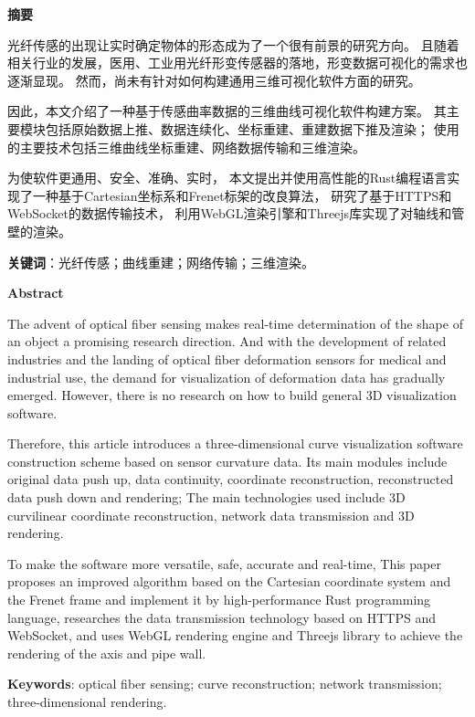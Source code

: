\clearpage
\begin{center}
    \bfseries {} 摘要
\end{center}

光纤传感的出现让实时确定物体的形态成为了一个很有前景的研究方向。
且随着相关行业的发展，医用、工业用光纤形变传感器的落地，形变数据可视化的需求也逐渐显现。
然而，尚未有针对如何构建通用三维可视化软件方面的研究。

因此，本文介绍了一种基于传感曲率数据的三维曲线可视化软件构建方案。
其主要模块包括原始数据上推、数据连续化、坐标重建、重建数据下推及渲染；
使用的主要技术包括三维曲线坐标重建、网络数据传输和三维渲染。

为使软件更通用、安全、准确、实时，
本文提出并使用高性能的Rust编程语言实现了一种基于Cartesian坐标系和Frenet标架的改良算法，
研究了基于HTTPS和WebSocket的数据传输技术，
利用WebGL渲染引擎和Threejs库实现了对轴线和管壁的渲染。

\textbf{关键词}：光纤传感；曲线重建；网络传输；三维渲染。

\clearpage

\begin{center}
    \bfseries {} Abstract
\end{center}

The advent of optical fiber sensing makes real-time determination of the shape of an object a promising research direction.
And with the development of related industries and the landing of optical fiber deformation sensors for medical and industrial use, the demand for visualization of deformation data has gradually emerged.
However, there is no research on how to build general 3D visualization software.

Therefore, this article introduces a three-dimensional curve visualization software construction scheme based on sensor curvature data.
Its main modules include original data push up, data continuity, coordinate reconstruction, reconstructed data push down and rendering;
The main technologies used include 3D curvilinear coordinate reconstruction, network data transmission and 3D rendering.

To make the software more versatile, safe, accurate and real-time,
This paper proposes an improved algorithm based on the Cartesian coordinate system and the Frenet frame and implement it by high-performance Rust programming language,
researches the data transmission technology based on HTTPS and WebSocket,
and uses WebGL rendering engine and Threejs library to achieve the rendering of the axis and pipe wall.

\textbf{Keywords}: optical fiber sensing; curve reconstruction; network transmission; three-dimensional rendering.